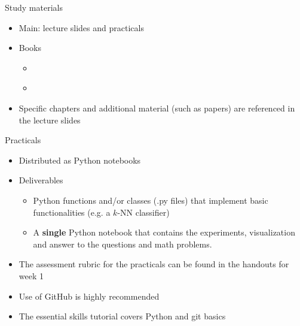 \documentclass[notes]{beamer}          %
\begin{document}
\begin{frame}{Study materials}
\begin{itemize}
\item Main: lecture slides and practicals
\item Books
\begin{itemize}
    \item \cite{deeplearning}
    \item \cite{elements}
\end{itemize}
\item Specific chapters and additional material (such as papers) are referenced in the lecture slides
\end{itemize}
\end{frame}

\begin{frame}{Practicals}
\begin{itemize}
    \item Distributed as Python notebooks
    \item Deliverables
    \begin{itemize}
        \item Python functions and/or classes (.py files) that implement basic functionalities (e.g. a $k$-NN classifier)
        \item A \textbf{single} Python notebook that contains the experiments, visualization and answer to the questions and math problems.
    \end{itemize}
    \item The assessment rubric for the practicals can be found in the handouts for week 1
    \item Use of GitHub is highly recommended 
    \item The essential skills tutorial covers Python and git basics
\end{itemize}    
\end{frame}
\end{document}
